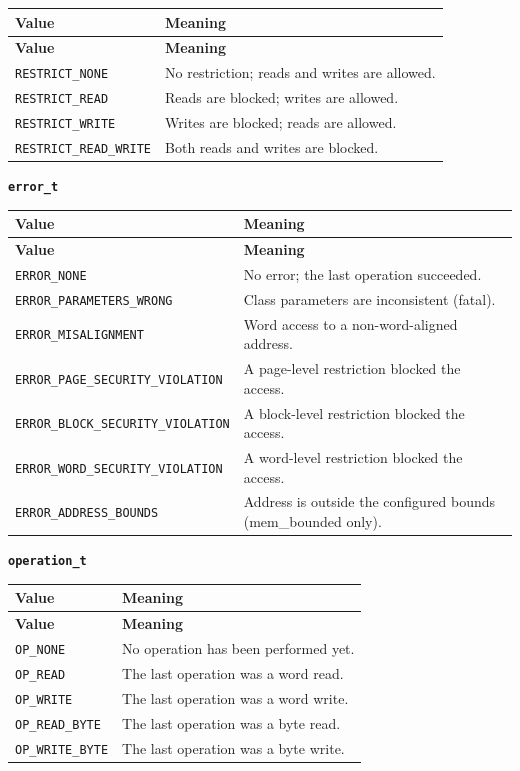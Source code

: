 \documentclass[11pt,letterpaper]{report}
\begin{document}
\begin{xltabular}{\linewidth}{lX}
\toprule
\textbf{Value} & \textbf{Meaning} \\
\midrule
\endfirsthead
\toprule
\textbf{Value} & \textbf{Meaning} \\
\midrule
\endhead
\bottomrule
\endlastfoot
\texttt{RESTRICT\_NONE} & No restriction; reads and writes are allowed. \\
\texttt{RESTRICT\_READ} & Reads are blocked; writes are allowed. \\
\texttt{RESTRICT\_WRITE} & Writes are blocked; reads are allowed. \\
\texttt{RESTRICT\_READ\_WRITE} & Both reads and writes are blocked. \\
\end{xltabular}

\noindent\textbf{\texttt{error\_t}}

\begin{xltabular}{\linewidth}{lX}
\toprule
\textbf{Value} & \textbf{Meaning} \\
\midrule
\endfirsthead
\toprule
\textbf{Value} & \textbf{Meaning} \\
\midrule
\endhead
\bottomrule
\endlastfoot
\texttt{ERROR\_NONE} & No error; the last operation succeeded. \\
\texttt{ERROR\_PARAMETERS\_WRONG} & Class parameters are inconsistent (fatal). \\
\texttt{ERROR\_MISALIGNMENT} & Word access to a non-word-aligned address. \\
\texttt{ERROR\_PAGE\_SECURITY\_VIOLATION} & A page-level restriction blocked the access. \\
\texttt{ERROR\_BLOCK\_SECURITY\_VIOLATION} & A block-level restriction blocked the access. \\
\texttt{ERROR\_WORD\_SECURITY\_VIOLATION} & A word-level restriction blocked the access. \\
\texttt{ERROR\_ADDRESS\_BOUNDS} & Address is outside the configured bounds (mem\_bounded only). \\
\end{xltabular}

\noindent\textbf{\texttt{operation\_t}}

\begin{xltabular}{\linewidth}{lX}
\toprule
\textbf{Value} & \textbf{Meaning} \\
\midrule
\endfirsthead
\toprule
\textbf{Value} & \textbf{Meaning} \\
\midrule
\endhead
\bottomrule
\endlastfoot
\texttt{OP\_NONE} & No operation has been performed yet. \\
\texttt{OP\_READ} & The last operation was a word read. \\
\texttt{OP\_WRITE} & The last operation was a word write. \\
\texttt{OP\_READ\_BYTE} & The last operation was a byte read. \\
\texttt{OP\_WRITE\_BYTE} & The last operation was a byte write. \\
\end{xltabular}
\end{document}
